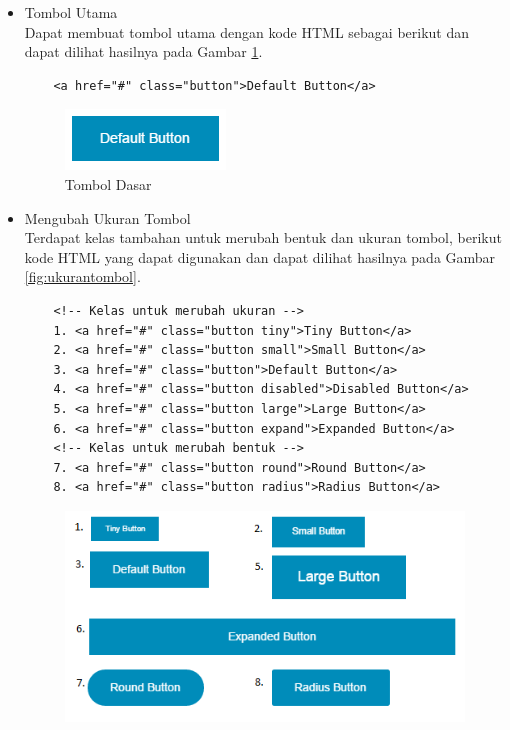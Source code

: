 \begin{enumerate}[(1)]
\begin{itemize}
  \item Tombol Utama\\
  Dapat membuat tombol utama dengan kode HTML sebagai berikut dan dapat
  dilihat hasilnya pada Gambar \ref{fig:tomboldasar}.
  	\begin{lstlisting}
  	<a href="#" class="button">Default Button</a>
  	\end{lstlisting}
  	\begin{figure}[H]
	\centering
	\includegraphics[scale=1]{Gambar/tomboldasar.png}
	\caption[Tombol Dasar]{Tombol Dasar}
	\label{fig:tomboldasar}
	\end{figure}
  \item Mengubah Ukuran Tombol\\
  Terdapat kelas tambahan untuk merubah bentuk dan ukuran tombol, berikut kode
  HTML yang dapat digunakan dan dapat dilihat hasilnya pada Gambar
  \ref{fig:ukurantombol}.
  	\begin{lstlisting}
  	<!-- Kelas untuk merubah ukuran -->
	1. <a href="#" class="button tiny">Tiny Button</a>
	2. <a href="#" class="button small">Small Button</a>
	3. <a href="#" class="button">Default Button</a>
	4. <a href="#" class="button disabled">Disabled Button</a>
	5. <a href="#" class="button large">Large Button</a>
	6. <a href="#" class="button expand">Expanded Button</a>
	<!-- Kelas untuk merubah bentuk -->
	7. <a href="#" class="button round">Round Button</a>
	8. <a href="#" class="button radius">Radius Button</a>
  	\end{lstlisting}
  	\begin{figure}[H]
	\centering
	\includegraphics[scale=1]{Gambar/ukurantombol.png}

\end{figure}
\end{itemize}
\end{enumerate}
